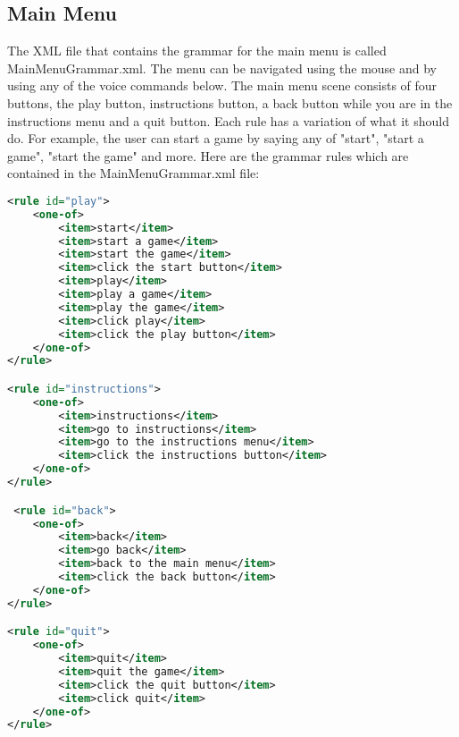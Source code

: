 \documentclass{article}
\begin{document}
\subsection{Main Menu}
The XML file that contains the grammar for the main menu is called MainMenuGrammar.xml. The menu can be navigated using the mouse and by using any of the voice commands below. The main menu scene consists of four buttons, the play button, instructions button, a back button while you are in the instructions menu and a quit button. Each rule has a variation of what it should do. For example, the user can start a game by saying any of "start", "start a game", "start the game" and more. Here are the grammar rules which are contained in the MainMenuGrammar.xml file:
\begin{lstlisting}[language=XML]
<rule id="play">
    <one-of>
        <item>start</item>
        <item>start a game</item>
        <item>start the game</item>
        <item>click the start button</item>
        <item>play</item>
        <item>play a game</item>
        <item>play the game</item>
        <item>click play</item>
        <item>click the play button</item>
    </one-of>
</rule>

<rule id="instructions">
    <one-of>
        <item>instructions</item>
        <item>go to instructions</item>
        <item>go to the instructions menu</item>
        <item>click the instructions button</item>
    </one-of>
</rule>

 <rule id="back">
    <one-of>
        <item>back</item>
        <item>go back</item>
        <item>back to the main menu</item>
        <item>click the back button</item>
    </one-of>
</rule>

<rule id="quit">
    <one-of>
        <item>quit</item>
        <item>quit the game</item>
        <item>click the quit button</item>
        <item>click quit</item>
    </one-of>
</rule>
\end{lstlisting}
\end{document}
